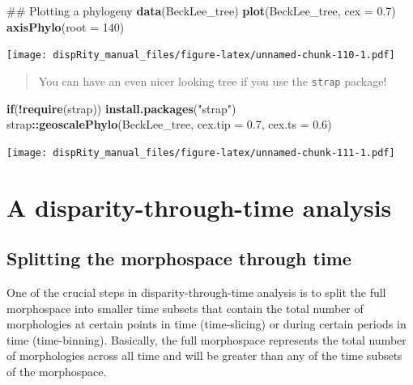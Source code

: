 \documentclass[]{book}
\newenvironment{Shaded}{\begin{snugshade}}{\end{snugshade}}
\newcommand{\KeywordTok}[1]{\textcolor[rgb]{0.13,0.29,0.53}{\textbf{#1}}}
\newcommand{\DataTypeTok}[1]{\textcolor[rgb]{0.13,0.29,0.53}{#1}}
\newcommand{\DecValTok}[1]{\textcolor[rgb]{0.00,0.00,0.81}{#1}}
\newcommand{\FloatTok}[1]{\textcolor[rgb]{0.00,0.00,0.81}{#1}}
\newcommand{\StringTok}[1]{\textcolor[rgb]{0.31,0.60,0.02}{#1}}
\newcommand{\ControlFlowTok}[1]{\textcolor[rgb]{0.13,0.29,0.53}{\textbf{#1}}}
\newcommand{\OperatorTok}[1]{\textcolor[rgb]{0.81,0.36,0.00}{\textbf{#1}}}
\newcommand{\NormalTok}[1]{#1}
\theoremstyle{definition}
\theoremstyle{definition}
\theoremstyle{definition}
\theoremstyle{remark}
\begin{document}
\begin{Shaded}
\begin{Highlighting}[]
\NormalTok{## Plotting a phylogeny}
\KeywordTok{data}\NormalTok{(BeckLee_tree)}
\KeywordTok{plot}\NormalTok{(BeckLee_tree, }\DataTypeTok{cex =} \FloatTok{0.7}\NormalTok{)}
\KeywordTok{axisPhylo}\NormalTok{(}\DataTypeTok{root =} \DecValTok{140}\NormalTok{)}
\end{Highlighting}
\end{Shaded}

\texttt{[image: dispRity\_manual\_files/figure-latex/unnamed-chunk-110-1.pdf]}

\begin{quote}
You can have an even nicer looking tree if you use the \texttt{strap}
package!
\end{quote}

\begin{Shaded}
\begin{Highlighting}[]
\ControlFlowTok{if}\NormalTok{(}\OperatorTok{!}\KeywordTok{require}\NormalTok{(strap)) }\KeywordTok{install.packages}\NormalTok{(}\StringTok{"strap"}\NormalTok{)}
\NormalTok{strap}\OperatorTok{::}\KeywordTok{geoscalePhylo}\NormalTok{(BeckLee_tree, }\DataTypeTok{cex.tip =} \FloatTok{0.7}\NormalTok{, }\DataTypeTok{cex.ts =} \FloatTok{0.6}\NormalTok{)}
\end{Highlighting}
\end{Shaded}

\texttt{[image: dispRity\_manual\_files/figure-latex/unnamed-chunk-111-1.pdf]}

\section{A disparity-through-time
analysis}\label{a-disparity-through-time-analysis}

\subsection{Splitting the morphospace through
time}\label{splitting-the-morphospace-through-time}

One of the crucial steps in disparity-through-time analysis is to split
the full morphospace into smaller time subsets that contain the total
number of morphologies at certain points in time (time-slicing) or
during certain periods in time (time-binning). Basically, the full
morphospace represents the total number of morphologies across all time
and will be greater than any of the time subsets of the morphospace.
\end{document}
